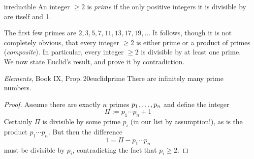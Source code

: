\begin{defn}{}{irreducible}
	An integer $\ge 2$ is \emph{prime} if the only positive integers it is divisible by are itself and 1.
\end{defn}

 The first few primes are $2,3,5,7,11,13,17,19,\ldots$ It follows, though it is not completely obvious, that every integer $\ge 2$ is either prime or a product of primes (\emph{composite}). In particular, every integer $\ge 2$ is divisible by at least one prime. We now state Euclid's result, and prove it by contradiction.

\begin{thm}{\emph{Elements}, Book IX, Prop.\,20}{euclidprime}
	There are infinitely many prime numbers.
\end{thm}

\begin{proof}
	Assume there are exactly $n$ primes ${p}_1,\ldots,{p}_{n}$ and define the integer
	\[
		\Pi:=p_1\cdots p_n+1
	\]
	Certainly $\Pi$ is divisible by some prime $p_i$ (in our list by assumption!), as is the product $p_1\cdots p_n$. But then the difference
	\[
		1=\Pi-p_1\cdots p_n
	\]
	must be divisible by $p_i$, contradicting the fact that $p_i\ge 2$.
\end{proof}


\goodbreak


